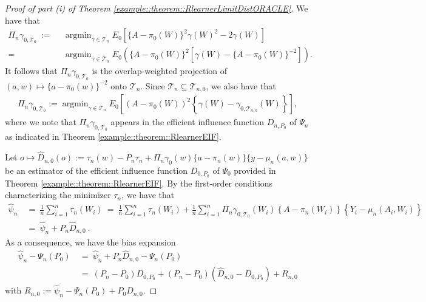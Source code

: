 \documentclass[11pt]{article}
\DeclareMathOperator*{\argmin}{argmin}
\theoremstyle{definition}
\begin{document}
 \begin{proof}[Proof of part (i) of Theorem   \ref{example::theorem::RlearnerLimitDistORACLE}]

We have that
\begin{align*}
    \Pi_n \gamma_{0, \mathcal{T}_0}\ :=&\ \ \argmin_{\gamma \in \mathcal{T}_n} E_0\left[\{A-\pi_0(W)\}^2\gamma(W)^2 -  2 \gamma(W) \right]\\
    =&\ \ \argmin_{\gamma \in \mathcal{T}_n} E_0\left( \{A-\pi_0(W)\}^2 \left[ \gamma(W) -  \{A-\pi_0(W)\}^{-2}\right]\right).
\end{align*}  
It follows that $\Pi_n \gamma_{0, \mathcal{T}_0}$ is the overlap-weighted projection of $(a,w) \mapsto \{a-\pi_0( w)\}^{-2}$ onto $\mathcal{T}_n$. Since $\mathcal{T}_n \subseteq \mathcal{T}_{n,0}$, we also have that
\begin{align*}
    \Pi_n \gamma_{0, \mathcal{T}_0} := \argmin_{\gamma \in \mathcal{T}_n} E_0\left[ (A-\pi_0(W))^2 \left\{ \gamma(W) - \gamma_{0, \mathcal{T}_{n,0}}(W) \right\}\right],
\end{align*} 
 where we note that $\Pi_n \gamma_{0, \mathcal{T}_0}$ appears in the efficient influence function $D_{n,P_0}$ of $\Psi_n$ as indicated in Theorem \ref{example::theorem::RlearnerEIF}. 
 
 
 Let $o \mapsto \widehat D_{n,0}(o) := \tau_n(w) - P_n \tau_n + \Pi_n\gamma_{0}(w)\{a-\pi_n(w)\}\{y - \mu_n(a,w)\}$ be an estimator of the efficient influence function $D_{0,P_0}$ of $\Psi_0$ provided in Theorem \ref{example::theorem::RlearnerEIF}. %
 By the first-order conditions characterizing the minimizer $\tau_n$,  we have that
\begin{align*}
     \widehat{\psi}_n \ &=\ \frac{1}{n}\sum_{i=1}^n \tau_n(W_i)\ =\  \frac{1}{n}\sum_{i=1}^n \tau_n(W_i)   + 
    \frac{1}{n}\sum_{i=1}^n \Pi_n \gamma_{0, \mathcal{T}_0}(W_i)\left\{A-\pi_n(W_i)\right\} \left\{Y_i -\mu_n(A_i,W_i) \right\} \\
    & =\  \widehat{\psi}_n + P_n \widehat D_{n,0}\ .
\end{align*}
As a consequence, we have the bias expansion
\begin{align*}
    \widehat{\psi}_n - \Psi_n(P_0)\ &=\  \widehat{\psi}_n + P_n \widehat D_{n,0}  - \Psi_n(P_0)\\
    &=\ (P_n-P_0)D_{0,P_{0}}  + (P_n-P_0)(\widehat D_{n,0} - D_{0,P_{0}}) + R_{n,0}
\end{align*} 
with
$R_{n,0} :=  \widehat{\psi}_n - \Psi_n(P_0) + P_0 \widehat D_{n,0}$. 


\end{proof}
\end{document}
